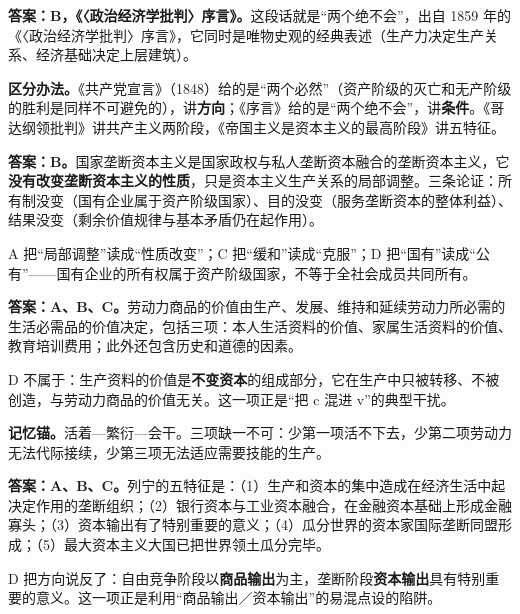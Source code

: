 \documentclass[11pt]{ctexart}
\newcommand{\dw}[1]{\textbf{\color{violetdeep}#1}}   %
\begin{document}
\textbf{答案：B，《〈政治经济学批判〉序言》。}这段话就是“两个绝不会”，出自 1859 年的《〈政治经济学批判〉序言》，它同时是唯物史观的经典表述（生产力决定生产关系、经济基础决定上层建筑）。

\textbf{区分办法。}《共产党宣言》（1848）给的是“两个必然”（资产阶级的灭亡和无产阶级的胜利是同样不可避免的），讲\dw{方向}；《序言》给的是“两个绝不会”，讲\dw{条件}。《哥达纲领批判》讲共产主义两阶段，《帝国主义是资本主义的最高阶段》讲五特征。


\textbf{答案：B。}国家垄断资本主义是国家政权与私人垄断资本融合的垄断资本主义，它\dw{没有改变垄断资本主义的性质}，只是资本主义生产关系的局部调整。三条论证：所有制没变（国有企业属于资产阶级国家）、目的没变（服务垄断资本的整体利益）、结果没变（剩余价值规律与基本矛盾仍在起作用）。

A 把“局部调整”读成“性质改变”；C 把“缓和”读成“克服”；D 把“国有”读成“公有”——国有企业的所有权属于资产阶级国家，不等于全社会成员共同所有。


\textbf{答案：A、B、C。}劳动力商品的价值由生产、发展、维持和延续劳动力所必需的生活必需品的价值决定，包括三项：本人生活资料的价值、家属生活资料的价值、教育培训费用；此外还包含历史和道德的因素。

D 不属于：生产资料的价值是\dw{不变资本}的组成部分，它在生产中只被转移、不被创造，与劳动力商品的价值无关。这一项正是“把 c 混进 v”的典型干扰。

\textbf{记忆锚。}活着—繁衍—会干。三项缺一不可：少第一项活不下去，少第二项劳动力无法代际接续，少第三项无法适应需要技能的生产。


\textbf{答案：A、B、C。}列宁的五特征是：（1）生产和资本的集中造成在经济生活中起决定作用的垄断组织；（2）银行资本与工业资本融合，在金融资本基础上形成金融寡头；（3）资本输出有了特别重要的意义；（4）瓜分世界的资本家国际垄断同盟形成；（5）最大资本主义大国已把世界领土瓜分完毕。

D 把方向说反了：自由竞争阶段以\dw{商品输出}为主，垄断阶段\dw{资本输出}具有特别重要的意义。这一项正是利用“商品输出／资本输出”的易混点设的陷阱。
\end{document}
